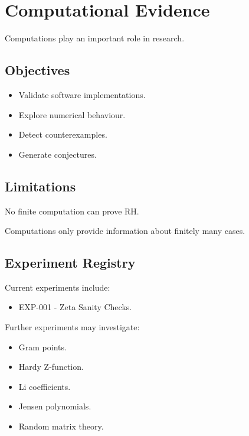 \section{Computational Evidence}

Computations play an important role in research.

\subsection{Objectives}

\begin{itemize}
\item Validate software implementations.
\item Explore numerical behaviour.
\item Detect counterexamples.
\item Generate conjectures.
\end{itemize}

\subsection{Limitations}

No finite computation can prove RH.

Computations only provide information about finitely many cases.

\subsection{Experiment Registry}

Current experiments include:

\begin{itemize}
\item EXP-001 - Zeta Sanity Checks.
\end{itemize}

Further experiments may investigate:

\begin{itemize}
\item Gram points.
\item Hardy Z-function.
\item Li coefficients.
\item Jensen polynomials.
\item Random matrix theory.
\end{itemize}